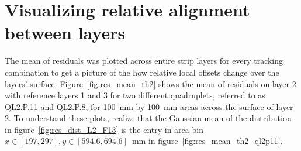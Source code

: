 \section{Visualizing relative alignment between layers}

The mean of residuals was plotted across entire strip layers for every tracking combination to get a picture of the how relative local offsets change over the layers' surface. Figure~\ref{fig:res_mean_th2} shows the mean of residuals on layer 2 with reference layers 1 and 3 for two different quadruplets, referred to as QL2.P.11 and QL2.P.8, for \SI{100}{mm} by \SI{100}{mm} areas across the surface of layer 2. To understand these plots, realize that the Gaussian mean of the distribution in figure~\ref{fig:res_dist_L2_F13} is the entry in area bin $x\in\left[197, 297\right],  y\in\left[594.6, 694.6\right]$~mm in figure~\ref{fig:res_mean_th2_ql2p11}.

